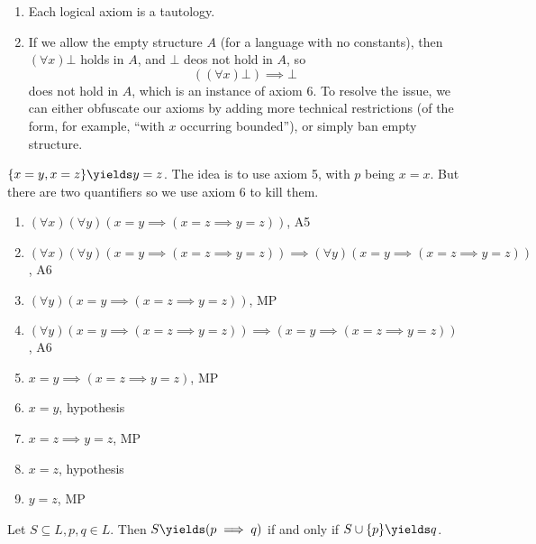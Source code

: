 \documentclass[a4paper]{article}
\begin{document}
\begin{note}\leavevmode
  \label{note:empty structure}
  \begin{enumerate}
  \item Each logical axiom is a tautology.
  \item If we allow the empty structure \(A\) (for a language with no constants), then \((\forall x) \bot \) holds in \(A\), and \(\bot\) deos not hold in \(A\), so
    \[
      ((\forall x) \bot) \implies \bot
    \]
    does not hold in \(A\), which is an instance of axiom 6. To resolve the issue, we can either obfuscate our axioms by adding more technical restrictions (of the form, for example, ``with \(x\) occurring bounded''), or simply ban empty structure.
  \end{enumerate}
\end{note}

\begin{eg}
  \(\{x = y, x = z\} \yields y = z\). The idea is to use axiom 5, with \(p\) being \(x = x\). But there are two quantifiers so we use axiom 6 to kill them.
  \begin{enumerate}
  \item \((\forall x) (\forall y) (x = y \implies (x = z \implies y = z))\), A5
  \item \((\forall x) (\forall y) (x = y \implies (x = z \implies y = z)) \implies (\forall y)(x = y \implies (x = z \implies y = z))\), A6
  \item \((\forall y) (x = y \implies (x = z \implies y = z))\), MP
  \item \((\forall y) (x = y \implies (x = z \implies y = z)) \implies (x = y \implies (x = z \implies y = z))\), A6
  \item \(x = y \implies (x = z \implies y = z)\), MP
  \item \(x = y\), hypothesis
  \item \(x = z \implies y = z\), MP
  \item \(x = z\), hypothesis
  \item \(y = z\), MP
  \end{enumerate}
\end{eg}

\begin{proposition}
  Let \(S \subseteq L, p, q \in L\). Then \(S \yields (p \implies q)\) if and only if \(S \cup \{p\} \yields q\).
\end{proposition}
\end{document}
